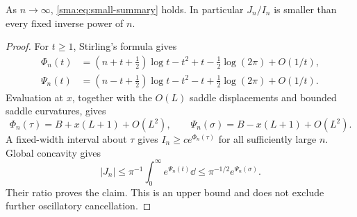 \documentclass[11pt,letterpaper]{article}
\numberwithin{equation}{section}
\begin{document}
\begin{proposition}\label{sma:prop:small}
As $n\to\infty$, \eqref{sma:eq:small-summary} holds. In particular $J_n/I_n$ is smaller than every fixed inverse power of $n$.
\end{proposition}
\begin{proof}
For $t\ge1$, Stirling's formula gives
\begin{align*}
 \Phi_n(t)&=(n+t+\tfrac12)\log t-t^2+t-\tfrac12\log(2\pi)+O(1/t),\\
 \Psi_n(t)&=(n-t+\tfrac12)\log t-t^2-t+\tfrac12\log(2\pi)+O(1/t).
\end{align*}
Evaluation at $x$, together with the $O(L)$ saddle displacements and bounded saddle curvatures, gives
\[
 \Phi_n(\tau)=B+x(L+1)+O(L^2),\qquad
 \Psi_n(\sigma)=B-x(L+1)+O(L^2).
\]
A fixed-width interval about $\tau$ gives $I_n\ge c e^{\Phi_n(\tau)}$ for all sufficiently large $n$. Global concavity gives
\[
 |J_n|\le\pi^{-1}\int_0^\infty e^{\Psi_n(t)}\dd
 \le\pi^{-1/2}e^{\Psi_n(\sigma)}.
\]
Their ratio proves the claim. This is an upper bound and does not exclude further oscillatory cancellation.
\end{proof}
\end{document}
